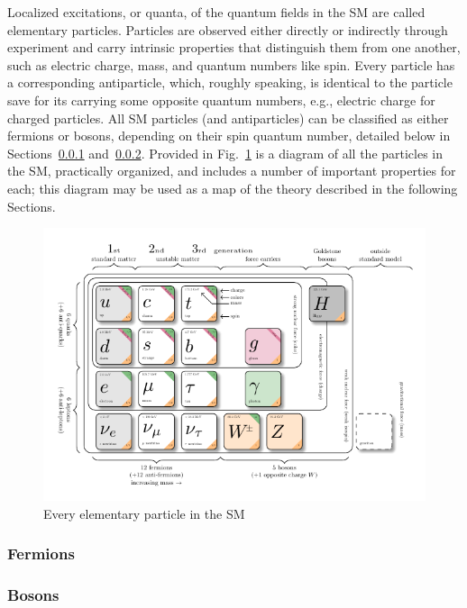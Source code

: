 Localized excitations, or quanta, of the quantum fields in the SM are called elementary particles. Particles are observed either directly or indirectly through experiment and carry intrinsic properties that distinguish them from one another, such as electric charge, mass, and quantum numbers like spin. Every particle has a corresponding antiparticle, which, roughly speaking, is identical to the particle save for its carrying some opposite quantum numbers, e.g., electric charge for charged particles. All SM particles (and antiparticles) can be classified as either fermions or bosons, depending on their spin quantum number, detailed below in Sections~\ref{sec:Fermions} and~\ref{sec:Bosons}. Provided in Fig.~\ref{fig:SM} is a diagram of all the particles in the SM, practically organized, and includes a number of important properties for each; this diagram may be used as a map of the theory described in the following Sections.

\begin{figure}[H]
    \centering
    \includegraphics[width=1\textwidth]{Images/Theory/model-physics.pdf}
    \caption{Every elementary particle in the SM}
    \label{fig:SM}
\end{figure}

\subsubsection{Fermions} \label{sec:Fermions}


\subsubsection{Bosons} \label{sec:Bosons}
